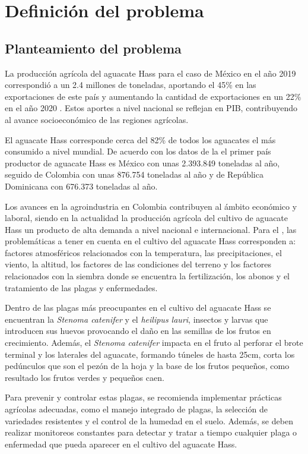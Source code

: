 \section{Definición del problema}

\subsection{Planteamiento del problema}
La producción agrícola del aguacate Hass para el caso de México en el año 2019 correspondió a un 2.4 millones de toneladas, aportando el 45\% en las exportaciones de este país y aumentando la cantidad de exportaciones en un 22\% en el año 2020 \citep{cruz2022competitividad}. Estos aportes a nivel nacional se reflejan en PIB, contribuyendo al avance socioeconómico de las regiones agrícolas.

El aguacate Hass corresponde cerca del 82\% de todos los aguacates el más consumido a nivel mundial. De acuerdo con los datos de la \citet{faostat2021hacia} el primer país productor de aguacate Hass es México con unas 2.393.849 toneladas al año, seguido de Colombia con unas 876.754 toneladas al año y de República Dominicana con 676.373 toneladas al año.

Los avances en la agroindustria en Colombia contribuyen al ámbito económico y laboral, siendo en la actualidad la producción agrícola del cultivo de aguacate Hass un producto de alta demanda a nivel nacional e internacional. Para el \citet{dane2016cultivo}, las problemáticas a tener en cuenta en el cultivo del aguacate Hass corresponden a: factores atmosféricos relacionados con la temperatura, las precipitaciones, el viento, la altitud, los factores de las condiciones del terreno y los factores relacionados con la siembra donde se encuentra la fertilización, los abonos y el tratamiento de las plagas y enfermedades.

Dentro de las plagas más preocupantes en el cultivo del aguacate Hass se encuentran la \textit{Stenoma catenifer} y el \textit{heilipus lauri}, insectos y larvas que introducen sus huevos provocando el daño en las semillas de los frutos en crecimiento. Además, el \textit{Stenoma catenifer} impacta en el fruto al perforar el brote terminal y los laterales del aguacate, formando túneles de hasta 25cm, corta los pedúnculos que son el pezón de la hoja y la base de los frutos pequeños, como resultado los frutos verdes y pequeños caen.

Para prevenir y controlar estas plagas, se recomienda implementar prácticas agrícolas adecuadas, como el manejo integrado de plagas, la selección de variedades resistentes y el control de la humedad en el suelo. Además, se deben realizar monitoreos constantes para detectar y tratar a tiempo cualquier plaga o enfermedad que pueda aparecer en el cultivo del aguacate Hass.

